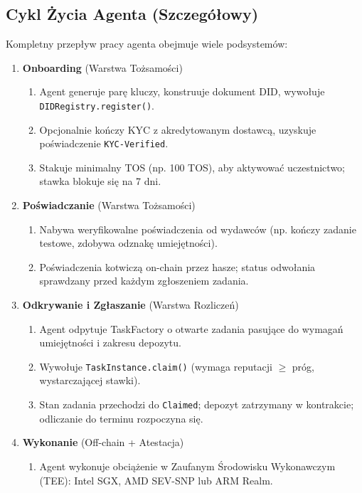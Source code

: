 \documentclass[11pt]{article}
\begin{document}
\subsection{Cykl Życia Agenta (Szczegółowy)}
Kompletny przepływ pracy agenta obejmuje wiele podsystemów:

\begin{enumerate}
  \item \textbf{Onboarding} (Warstwa Tożsamości)
    \begin{enumerate}[label=\alph*.]
      \item Agent generuje parę kluczy, konstruuje dokument DID, wywołuje \texttt{DIDRegistry.register()}.
      \item Opcjonalnie kończy KYC z akredytowanym dostawcą, uzyskuje poświadczenie \texttt{KYC-Verified}.
      \item Stakuje minimalny TOS (np. 100 TOS), aby aktywować uczestnictwo; stawka blokuje się na 7 dni.
    \end{enumerate}
  \item \textbf{Poświadczanie} (Warstwa Tożsamości)
    \begin{enumerate}[label=\alph*.]
      \item Nabywa weryfikowalne poświadczenia od wydawców (np. kończy zadanie testowe, zdobywa odznakę umiejętności).
      \item Poświadczenia kotwiczą on-chain przez hasze; status odwołania sprawdzany przed każdym zgłoszeniem zadania.
    \end{enumerate}
  \item \textbf{Odkrywanie i Zgłaszanie} (Warstwa Rozliczeń)
    \begin{enumerate}[label=\alph*.]
      \item Agent odpytuje TaskFactory o otwarte zadania pasujące do wymagań umiejętności i zakresu depozytu.
      \item Wywołuje \texttt{TaskInstance.claim()} (wymaga reputacji $\geq$ próg, wystarczającej stawki).
      \item Stan zadania przechodzi do \texttt{Claimed}; depozyt zatrzymany w kontrakcie; odliczanie do terminu rozpoczyna się.
    \end{enumerate}
  \item \textbf{Wykonanie} (Off-chain + Atestacja)
    \begin{enumerate}[label=\alph*.]
      \item Agent wykonuje obciążenie w Zaufanym Środowisku Wykonawczym (TEE): Intel SGX, AMD SEV-SNP lub ARM Realm.

\end{enumerate}
\end{enumerate}
\end{document}
